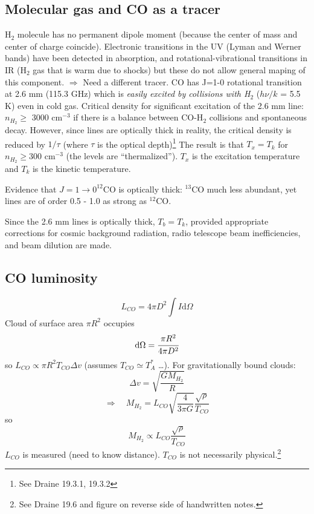 \documentclass[11pt]{article}
\newcommand{\mar}[1]{\hspace{0pt}\marginpar{-\textcolor{black}{#1}-}}
\begin{document}
\subsection{Molecular gas and CO as a tracer}
\mar{128}H$_{2}$ molecule has no permanent dipole moment (because the
center of mass and center of charge coincide). Electronic transitions in the
UV (Lyman and Werner bands) have been detected in absorption, and
rotational-vibrational transitions in IR (H$_{2}$ gas that is warm due to shocks)
but these do not allow general maping of this component.
$\Rightarrow$ Need a different tracer. CO has J=1-0 rotational transition
at 2.6 mm (115.3 GHz) which is \emph{easily excited by collisions with
H$_{2}$} ($h\nu/k$ = 5.5 K) even in cold gas. Critical density for
significant excitation of the 2.6 mm line:
$n_{H_{2}} \geq$ 3000 cm$^{-3}$ if there is a balance between CO-H$_{2}$
collisions and spontaneous decay. However, since lines are optically thick
in reality, the critical density is reduced by $1/\tau$ (where $\tau$ is the
optical depth)\footnote{
    See Draine 19.3.1, 19.3.2}
The result is that $T_{x} = T_{k}$ for $n_{H_{2}} \geq 300$ cm$^{-3}$
(the levels are ``thermalized''). $T_{x}$ is the excitation temperature and
$T_{k}$ is the kinetic temperature.

\mar{129}Evidence that $J = 1 \rightarrow 0 ^{12}$CO is optically thick:
$^{13}$CO much less abundant, yet lines are of order 0.5 - 1.0 as strong
as $^{12}$CO.

Since the 2.6 mm lines is optically thick, $T_{b} = T_{k}$, provided
appropriate corrections for cosmic background radiation, radio telescope
beam inefficiencies, and beam dilution are made.

\subsection{CO luminosity}
\mar{130}
\[
    L_{CO} = 4{\pi}D^{2} \int{ I \mathrm{d}\Omega }
    \]
Cloud of surface area ${\pi}R^{2}$ occupies
\[
    \mathrm{d}\Omega = \cfrac{{\pi}R^{2}}{4{\pi}D^{2}}
    \]
so $L_{CO} \propto {\pi}R^{2} T_{CO} {\Delta}v$
(assumes $T_{CO} \simeq T_{A}^{*}$ \ldots).
For gravitationally bound clouds:
\[
    {\Delta}v = \sqrt{ \frac{GM_{H_{2}}}{R} }
    \]
\[
    \Longrightarrow \quad
    M_{H_{2}} = L_{CO} \sqrt{ \frac{4}{3{\pi}G} } \frac{\sqrt{\rho}}{T_{CO}}
    \]
so
\[
    M_{H_{2}} \propto L_{CO} \frac{\sqrt{\rho}}{T_{CO}}
    \]
$L_{CO}$ is measured (need to know distance). $T_{CO}$ is not necessarily
physical.\footnote{
    See Draine 19.6 and figure on reverse side of handwritten notes.}
\end{document}
